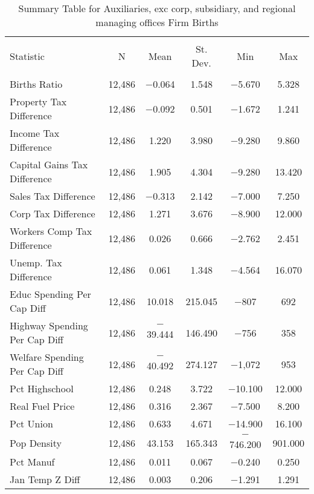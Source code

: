 
\begin{table}[!htbp] \centering 
  \caption{Summary Table for  Auxiliaries, exc corp, subsidiary, and regional managing offices Firm Births} 
  \label{95summary} 
\begin{tabular}{@{\extracolsep{5pt}}lccccc} 
\\[-1.8ex]\hline 
\hline \\[-1.8ex] 
Statistic & \multicolumn{1}{c}{N} & \multicolumn{1}{c}{Mean} & \multicolumn{1}{c}{St. Dev.} & \multicolumn{1}{c}{Min} & \multicolumn{1}{c}{Max} \\ 
\hline \\[-1.8ex] 
Births Ratio & 12,486 & $-$0.064 & 1.548 & $-$5.670 & 5.328 \\ 
Property Tax Difference & 12,486 & $-$0.092 & 0.501 & $-$1.672 & 1.241 \\ 
Income Tax Difference & 12,486 & 1.220 & 3.980 & $-$9.280 & 9.860 \\ 
Capital Gains Tax Difference & 12,486 & 1.905 & 4.304 & $-$9.280 & 13.420 \\ 
Sales Tax Difference & 12,486 & $-$0.313 & 2.142 & $-$7.000 & 7.250 \\ 
Corp Tax Difference & 12,486 & 1.271 & 3.676 & $-$8.900 & 12.000 \\ 
Workers Comp Tax Difference & 12,486 & 0.026 & 0.666 & $-$2.762 & 2.451 \\ 
Unemp. Tax Difference & 12,486 & 0.061 & 1.348 & $-$4.564 & 16.070 \\ 
Educ Spending Per Cap Diff & 12,486 & 10.018 & 215.045 & $-$807 & 692 \\ 
Highway Spending Per Cap Diff & 12,486 & $-$39.444 & 146.490 & $-$756 & 358 \\ 
Welfare Spending Per Cap Diff & 12,486 & $-$40.492 & 274.127 & $-$1,072 & 953 \\ 
Pct Highschool & 12,486 & 0.248 & 3.722 & $-$10.100 & 12.000 \\ 
Real Fuel Price & 12,486 & 0.316 & 2.367 & $-$7.500 & 8.200 \\ 
Pct Union & 12,486 & 0.633 & 4.671 & $-$14.900 & 16.100 \\ 
Pop Density & 12,486 & 43.153 & 165.343 & $-$746.200 & 901.000 \\ 
Pct Manuf & 12,486 & 0.011 & 0.067 & $-$0.240 & 0.250 \\ 
Jan Temp Z Diff & 12,486 & 0.003 & 0.206 & $-$1.291 & 1.291 \\ 

\end{tabular}
\end{table}
